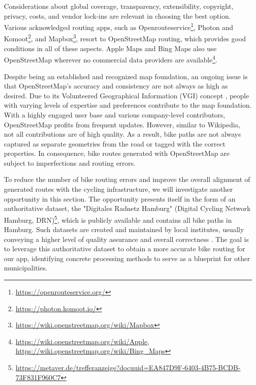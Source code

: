Considerations about global coverage, transparency, extensibility, copyright, privacy, costs, and vendor lock-ins are relevant in choosing the best option. Various acknowledged routing apps, such as Openrouteservice\footnote{\url{https://openrouteservice.org/}}, Photon and Komoot\footnote{\url{https://photon.komoot.io/}}, and Mapbox\footnote{\url{https://wiki.openstreetmap.org/wiki/Mapbox}}, resort to OpenStreetMap routing, which provides good conditions in all of these aspects. Apple Maps and Bing Maps also use OpenStreetMap wherever no commercial data providers are available\footnote{\url{https://wiki.openstreetmap.org/wiki/Apple}, \url{https://wiki.openstreetmap.org/wiki/Bing_Maps}}. 

Despite being an established and recognized map foundation, an ongoing issue is that Open\allowbreak Street\allowbreak Map's accuracy and consistency are not always as high as desired. Due to its Volunteered Geographical Information (VGI) concept \cite{wasserman_evaluating_2019, jacobs_openstreetmap_2020, vybornova_automated_2023}, people with varying levels of expertise and preferences contribute to the map foundation. With a highly engaged user base and various company-level contributors, OpenStreetMap profits from frequent updates. However, similar to Wikipedia, not all contributions are of high quality. As a result, bike paths are not always captured as separate geometries from the road or tagged with the correct properties. In consequence, bike routes generated with OpenStreetMap are subject to imperfections and routing errors.

To reduce the number of bike routing errors and improve the overall alignment of generated routes with the cycling infrastructure, we will investigate another opportunity in this section. The opportunity presents itself in the form of an authoritative dataset, the "Digitales Radnetz Hamburg" (Digital Cycling Network Hamburg, DRN)\footnote{\url{https://metaver.de/trefferanzeige?docuuid=EA847D9F-6403-4B75-BCDB-73F831F960C7}}, which is publicly available and contains all bike paths in Hamburg. Such datasets are created and maintained by local institutes, usually conveying a higher level of quality assurance and overall correctness \cite{englede_efficient_2013, brovelli_towards_2017}. The goal is to leverage this authoritative dataset to obtain a more accurate bike routing for our app, identifying concrete processing methods to serve as a blueprint for other municipalities.

